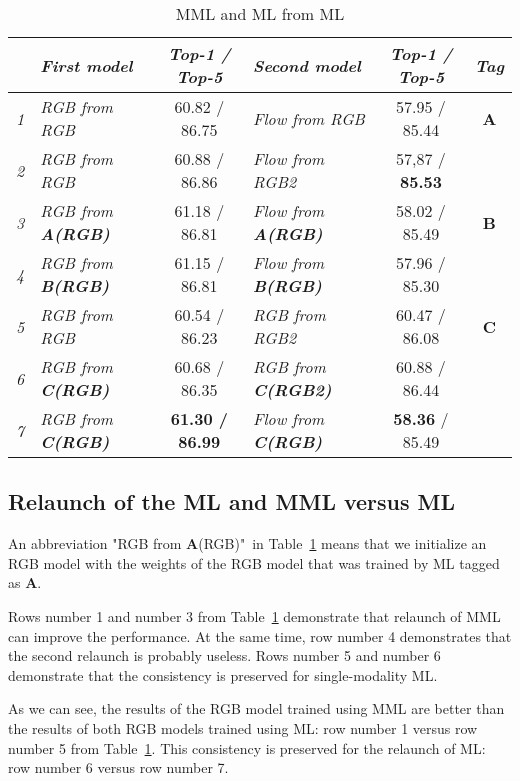 \documentclass[conference]{IEEEtran}
\begin{document}
\begin{table}[!t]	
	\centering
	\caption{MML and ML from ML}
	\label{tab:mml}
	\centering
	\begin{tabular}{|c|m{}|c|m{}|c|c|} 
		\hline & \it First model & \it Top-1 / Top-5 & \it Second model & \it Top-1 / Top-5 & \it Tag \\ \hline
		\it 1 & \it RGB from RGB & 60.82 / 86.75 & \it Flow from RGB & 57.95 / 85.44 & \bf A \\ \hline
		\it 2 & \it RGB from RGB & 60.88 / 86.86 & \it Flow from RGB2 & 57,87 / \textbf{85.53} & \\ \hline
		\it 3 & \it RGB from \bf A\it (RGB) & 61.18 / 86.81 & \it Flow from \bf A\it (RGB) & 58.02 / 85.49 & \bf B \\ \hline
		\it 4 & \it RGB from \bf B\it (RGB) & 61.15 / 86.81 & \it Flow from \bf B\it (RGB) & 57.96 / 85.30 &  \\ \hline
		\it 5 & \it RGB from RGB & 60.54 / 86.23 & \it RGB from RGB2 & 60.47 / 86.08 & \bf C \\ \hline
		\it 6 & \it RGB from \bf C\it (RGB) & 60.68 / 86.35 & \it RGB from \bf C\it (RGB2) & 60.88 / 86.44 &  \\ \hline
		\it 7 & \it RGB from \bf C\it (RGB) & \bf 61.30 / 86.99 & \it Flow from \bf C\it (RGB) & \textbf{58.36} / 85.49 &  \\ \hline
	\end{tabular}
\end{table}

\subsection{Relaunch of the ML and MML versus ML}

An abbreviation "RGB from \textbf{A}(RGB)"\ in Table~\ref{tab:mml} means that we initialize an RGB model with the weights of the RGB model that was trained by ML tagged as \textbf{A}.

Rows number 1 and number 3 from Table~\ref{tab:mml} demonstrate that relaunch of MML can improve the performance. At the same time, row number 4 demonstrates that the second relaunch is probably useless. Rows number 5 and number 6 demonstrate that the consistency is preserved for single-modality ML.

As we can see, the results of the RGB model trained using MML are better than the results of both RGB models trained using ML: row number 1 versus row number 5 from Table~\ref{tab:mml}. This consistency is preserved for the relaunch of ML: row number 6 versus row number 7.
\end{document}
